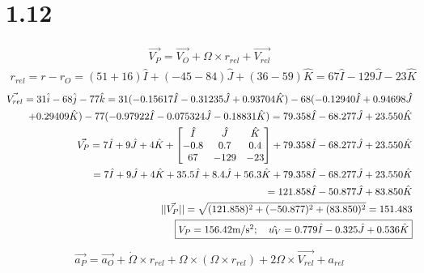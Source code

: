 \documentclass[12 pt]{article}
\begin{document}
\section*{1.12}
\begin{align*}
    \vec{V_P}=\vec{V_O}+\Omega \times r_{rel} + \vec{V_{rel}}
\end{align*}
\begin{align*}
    r_{rel}=r-r_O=(51+16)\hat{I} +(-45-84)\hat{J} + (36-59)\hat{K} = 67\hat{I} -129\hat{J}-23\hat{K}
\end{align*}
\begin{align*}
    \vec{V_{rel}}=31\hat{i} -68\hat{j}-77\hat{k}=31(-0.15617\hat{I}-0.31235\hat{J}+0.93704\hat{K})-68(-0.12940\hat{I}+0.94698\hat{J}\\
    +0.29409\hat{K})-77(-0.97922\hat{I}-0.075324\hat{J}-0.18831\hat{K})=79.358\hat{I}-68.277\hat{J}+23.550\hat{K} \\
    \vec{V_P}=7\hat{I}+9\hat{J}+4\hat{K} + \begin{bmatrix}
        \hat{I} & \hat{J} & \hat{K} \\
        -0.8 & 0.7 & 0.4 \\
        67 & -129 & -23
    \end{bmatrix} + 79.358\hat{I}-68.277\hat{J}+23.550\hat{K} \\
    = 7\hat{I}+9\hat{J}+4\hat{K} +35.5\hat{I}+8.4\hat{J}+56.3\hat{K} + 79.358\hat{I}-68.277\hat{J}+23.550\hat{K} \\
    = 121.858\hat{I} -50.877\hat{J} +83.850\hat{K} \\
    ||\vec{V_{P}}||=\sqrt{(121.858)^2+(-50.877)^2+(83.850)^2}=151.483 \\
    \fbox{$V_P=156.42 \textrm{m/s$^2$}; \quad \hat{u_V}=0.779\hat{I}-0.325\hat{J}+0.536\hat{K}$}
\end{align*}
\begin{align*}
    \vec{a_P}=\vec{a_O}+\dot{\Omega} \times r_{rel} + \Omega \times (\Omega \times r_{rel}) + 2\Omega \times \vec{V_{rel}} +a_{rel}
\end{align*}
\end{document}

